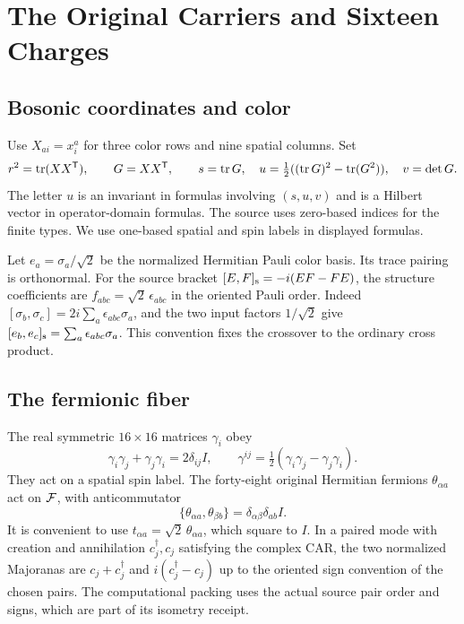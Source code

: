 \chapter{The Original Carriers and Sixteen Charges}\label{ch:source}

\section{Bosonic coordinates and color}
Use $X_{ai}=x_i^a$ for three color rows and nine spatial columns. Set
\[
 r^2=\operatorname{tr}(XX^{\mathsf T}),\qquad
 G=XX^{\mathsf T},\qquad
 s=\operatorname{tr}G,\quad u=\tfrac12((\operatorname{tr}G)^2-\operatorname{tr}(G^2)),\quad v=\det G .
\]
The letter $u$ is an invariant in formulas involving $(s,u,v)$ and is a Hilbert vector in operator-domain formulas. The source uses zero-based indices for the finite types. We use one-based spatial and spin labels in displayed formulas.

Let $e_a=\sigma_a/\sqrt{2}$ be the normalized Hermitian Pauli color basis. Its trace pairing is orthonormal. For the source bracket $[E,F]_{\rm s}=-i(EF-FE)$, the structure coefficients are $f_{abc}=\sqrt{2}\,\epsilon_{abc}$ in the oriented Pauli order. Indeed $[\sigma_b,\sigma_c]=2i\sum_a\epsilon_{abc}\sigma_a$, and the two input factors $1/\sqrt{2}$ give $[e_b,e_c]_{\rm s}=\sum_a\epsilon_{abc}\sigma_a$. This convention fixes the crossover to the ordinary cross product.

\section{The fermionic fiber}
The real symmetric $16\times16$ matrices $\gamma_i$ obey
\[
 \gamma_i\gamma_j+\gamma_j\gamma_i=2\delta_{ij}I,\qquad
 \gamma^{ij}=\tfrac12(\gamma_i\gamma_j-\gamma_j\gamma_i).
\]
They act on a spatial spin label. The forty-eight original Hermitian fermions $\theta_{\alpha a}$ act on $\mathcal F$, with anticommutator
\[
 \{\theta_{\alpha a},\theta_{\beta b}\}=\delta_{\alpha\beta}\delta_{ab}I.
\]
It is convenient to use $t_{\alpha a}=\sqrt{2}\,\theta_{\alpha a}$, which square to $I$. In a paired mode with creation and annihilation $c_j^\dagger,c_j$ satisfying the complex CAR, the two normalized Majoranas are $c_j+c_j^\dagger$ and $i(c_j^\dagger-c_j)$ up to the oriented sign convention of the chosen pairs. The computational packing uses the actual source pair order and signs, which are part of its isometry receipt.

